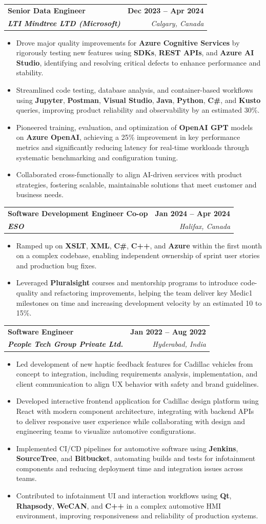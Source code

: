 \documentclass[letterpaper,11pt]{article}
\makeatletter
\newcommand{\resumeItem}[1]{
  \item\small{
    {#1 \vspace{-2pt}}
  }
}
\newcommand{\resumeSubheading}[4]{
  \vspace{-2pt}\item
    \begin{tabular*}{1.0\textwidth}[t]{l@{\extracolsep{\fill}}r}
      \textbf{#1} & \textbf{\small #2} \\
      \textit{\small#3} & \textit{\small #4} \\
    \end{tabular*}\vspace{-7pt}
}
\newcommand{\resumeItemListStart}{\begin{itemize}}
\newcommand{\resumeItemListEnd}{\end{itemize}\vspace{-5pt}}
\makeatother
\begin{document}
    \resumeSubheading
      {\textbf{Senior Data Engineer}}{\textbf{Dec 2023 -- Apr 2024}}
      {\textbf{LTI Mindtree LTD (Microsoft)}}{Calgary, Canada}
      \resumeItemListStart
        \resumeItem{Drove major quality improvements for \textbf{Azure Cognitive Services} by rigorously testing new features using \textbf{SDKs}, \textbf{REST APIs}, and \textbf{Azure AI Studio}, identifying and resolving critical defects to enhance performance and stability.}
        \resumeItem{Streamlined code testing, database analysis, and container-based workflows using \textbf{Jupyter}, \textbf{Postman}, \textbf{Visual Studio}, \textbf{Java}, \textbf{Python}, \textbf{C\#}, and \textbf{Kusto} queries, improving product reliability and observability by an estimated 30\%.}
        \resumeItem{Pioneered training, evaluation, and optimization of \textbf{OpenAI GPT} models on \textbf{Azure OpenAI}, achieving a 25\% improvement in key performance metrics and significantly reducing latency for real-time workloads through systematic benchmarking and configuration tuning.}
        \resumeItem{Collaborated cross-functionally to align AI-driven services with product strategies, fostering scalable, maintainable solutions that meet customer and business needs.}
      \resumeItemListEnd
    
    \resumeSubheading
      {\textbf{Software Development Engineer Co-op}}{\textbf{Jan 2024 -- Apr 2024}}
      {\textbf{ESO}}{Halifax, Canada}
      \resumeItemListStart
        \resumeItem{Ramped up on \textbf{XSLT}, \textbf{XML}, \textbf{C\#}, \textbf{C++}, and \textbf{Azure} within the first month on a complex codebase, enabling independent ownership of sprint user stories and production bug fixes.}
        \resumeItem{Leveraged \textbf{Pluralsight} courses and mentorship programs to introduce code-quality and refactoring improvements, helping the team deliver key Medic1 milestones on time and increasing development velocity by an estimated 10 to 15\%.}
      \resumeItemListEnd

    \resumeSubheading
      {\textbf{Software Engineer}}{\textbf{Jan 2022 -- Aug 2022}}
      {\textbf{People Tech Group Private Ltd.}}{Hyderabad, India}
      \resumeItemListStart
        \resumeItem{Led development of new haptic feedback features for Cadillac vehicles from concept to integration, including requirements analysis, implementation, and client communication to align UX behavior with safety and brand guidelines.}
        \resumeItem{Developed interactive frontend application for Cadillac design platform using React with modern component architecture, integrating with backend APIs to deliver responsive user experience while collaborating with design and engineering teams to visualize automotive configurations.}
        \resumeItem{Implemented CI/CD pipelines for automotive software using \textbf{Jenkins}, \textbf{SourceTree}, and \textbf{Bitbucket}, automating builds and tests for infotainment components and reducing deployment time and integration issues across teams.}
        \resumeItem{Contributed to infotainment UI and interaction workflows using \textbf{Qt}, \textbf{Rhapsody}, \textbf{WeCAN}, and \textbf{C++} in a complex automotive HMI environment, improving responsiveness and reliability of production systems.}
      \resumeItemListEnd
\end{document}
